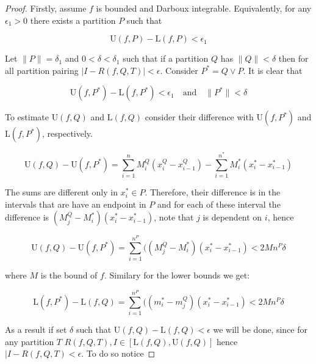 \begin{proof}
    Firstly, assume \(f\) is bounded and Darboux integrable. Equivalently, for any \(\epsilon_1 > 0\) there exists a partition \(P\) such that

    \begin{equation*}
        \text{U}(f,P) - \text{L}(f,P) <\epsilon_1
    \end{equation*}

    Let \(\|P\| = \delta_1 \) and \(0< \delta < \delta_1\) such that if a partition \(Q\) has \(\|Q\| < \delta\) then for all partition pairing \(|I - R(f,Q,T) | < \epsilon\). Consider \(P^* = Q \lor P\). It is clear that

    \begin{equation*}
        \text{U}(f,P^*) - \text{L}(f,P^*) <\epsilon_1 \quad \text{and} \quad \|P^*\| < \delta
    \end{equation*}

    To estimate \(\text{U}(f,Q)\) and \(\text{L}(f,Q)\) consider their difference with \(\text{U}(f,P^*)\) and \(\text{L}(f,P^*)\), respectively.

    \begin{equation*}
        \text{U}(f,Q) - \text{U}(f,P^*) = \sum_{i = 1}^{n}{M^Q_i (x^Q_i - x^Q_{i-1})} - \sum_{i = 1}^{n^*}{M^*_i (x^*_i - x^*_{i-1})}
    \end{equation*}

    The sums are different only in \(x^*_i \in P\). Therefore, their difference is in the intervals that are have an endpoint in \(P\) and for each of these interval the difference is \((M_j^Q - M_i^*)(x^*_i - x^*_{i-1})\), note that \(j\) is dependent on \(i\), hence

    \begin{equation*}
        \text{U}(f,Q) - \text{U}(f,P^*) = \sum_{i = 1}^{n^P}{((M_j^Q - M_i^*)(x^*_i - x^*_{i-1})} < 2Mn^P\delta
    \end{equation*}

    where \(M\) is the bound of \(f\). Similary for the lower bounds we get:

    \begin{equation*}
        \text{L}(f,P^*) - \text{L}(f,Q) = \sum_{i = 1}^{n^P}{((m_i^*- m_j^Q )(x^*_i - x^*_{i-1})} < 2Mn^P\delta
    \end{equation*}

    As a result if set \(\delta\) such that \(\text{U}(f,Q) - \text{L}(f,Q) < \epsilon\) we will be done, since for any partition \(T\) \(R(f,Q,T),I \in [ \text{L}(f,Q),\text{U}(f,Q)]\) hence \(| I - R(f,Q,T) < \epsilon\). To do so notice


\end{proof}
